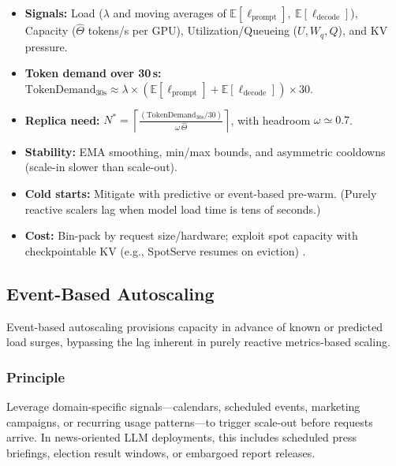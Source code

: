 \begin{tcolorbox}[
  title={\textbf{Metrics-Based Autoscaling: Practical Recipe}},
  colback=teal!5,
  colframe=teal!40!black,
  colbacktitle=teal!20,
  coltitle=black,
  fonttitle=\bfseries,
  boxrule=0.7pt,
  arc=4pt,
  left=5mm, right=5mm, top=4mm, bottom=4mm,
  before skip=6pt,
  after skip=6pt
]
\begin{itemize}[leftmargin=1.5em, itemsep=4pt]
  \item \textbf{Signals:} Load ($\lambda$ and moving averages of $\mathbb{E}[\ell_{\text{prompt}}],\ \mathbb{E}[\ell_{\text{decode}}]$), Capacity ($\hat{\Theta}$ tokens/s per GPU), Utilization/Queueing ($U, W_q, Q$), and KV pressure.
  
  \item \textbf{Token demand over 30\,s:} $\text{TokenDemand}_{30\text{s}}\approx \lambda\times(\mathbb{E}[\ell_{\text{prompt}}]+\mathbb{E}[\ell_{\text{decode}}])\times 30$.
  
  \item \textbf{Replica need:} $N^*=\left\lceil \frac{(\text{TokenDemand}_{30\text{s}}/30)}{\omega\,\hat{\Theta}}\right\rceil$, with headroom $\omega\simeq 0.7$.
  
  \item \textbf{Stability:} EMA smoothing, min/max bounds, and asymmetric cooldowns (scale-in slower than scale-out).
  
  \item \textbf{Cold starts:} Mitigate with predictive or event-based pre-warm. (Purely reactive scalers lag when model load time is tens of seconds.)
  
  \item \textbf{Cost:} Bin-pack by request size/hardware; exploit spot capacity with checkpointable KV (e.g., SpotServe resumes on eviction) \cite{pope2023exegpt}.
\end{itemize}
\end{tcolorbox}

\subsection{Event-Based Autoscaling}
\label{sec:scaling-event-autoscaling}
Event-based autoscaling provisions capacity in advance of known or predicted load surges, bypassing the lag inherent in purely reactive metrics-based scaling.

\subsubsection{Principle}
Leverage domain-specific signals---calendars, scheduled events, marketing campaigns, or recurring usage patterns---to trigger scale-out before requests arrive.
In news-oriented LLM deployments, this includes scheduled press briefings, election result windows, or embargoed report releases.

